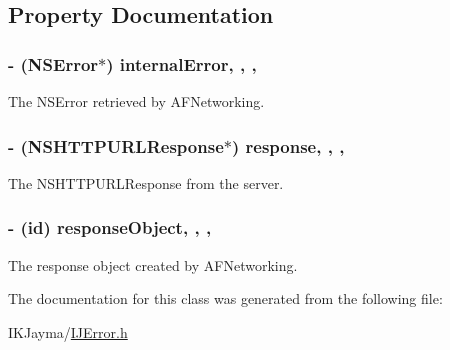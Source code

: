 \subsection{Property Documentation}
\hypertarget{interface_i_j_error_a3ece78b392ee71d2f358312bff1bb75a}{
\subsubsection[{internal\+Error}]{\setlength{\rightskip}{0pt plus 5cm}-\/ (N\+S\+Error$\ast$) internal\+Error\hspace{0.3cm}{\ttfamily [read]}, {\ttfamily [write]}, {\ttfamily [nonatomic]}, {\ttfamily [strong]}}}\label{interface_i_j_error_a3ece78b392ee71d2f358312bff1bb75a}
The N\+S\+Error retrieved by A\+F\+Networking. \hypertarget{interface_i_j_error_a44cfbf6891e5368a83d81407ac05ba4d}{
\subsubsection[{response}]{\setlength{\rightskip}{0pt plus 5cm}-\/ (N\+S\+H\+T\+T\+P\+U\+R\+L\+Response$\ast$) response\hspace{0.3cm}{\ttfamily [read]}, {\ttfamily [write]}, {\ttfamily [nonatomic]}, {\ttfamily [strong]}}}\label{interface_i_j_error_a44cfbf6891e5368a83d81407ac05ba4d}
The N\+S\+H\+T\+T\+P\+U\+R\+L\+Response from the server. \hypertarget{interface_i_j_error_ad9bbe1ee541238cfc14a42eb592260c6}{
\subsubsection[{response\+Object}]{\setlength{\rightskip}{0pt plus 5cm}-\/ (id) response\+Object\hspace{0.3cm}{\ttfamily [read]}, {\ttfamily [write]}, {\ttfamily [nonatomic]}, {\ttfamily [strong]}}}\label{interface_i_j_error_ad9bbe1ee541238cfc14a42eb592260c6}
The response object created by A\+F\+Networking. 

The documentation for this class was generated from the following file\+:\begin{DoxyCompactItemize}
\item 
I\+K\+Jayma/\hyperlink{_i_j_error_8h}{I\+J\+Error.\+h}\end{DoxyCompactItemize}
